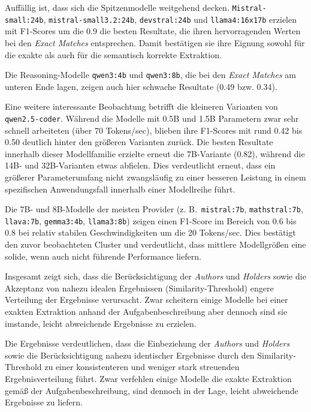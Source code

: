 Auffällig ist, dass sich die Spitzenmodelle weitgehend decken. \texttt{Mistral-small:24b}, \texttt{mistral-small3.2:24b}, \texttt{devstral:24b} und \texttt{llama4:16x17b} erzielen mit F1-Scores um die \num{0.9} die besten Resultate, die ihren hervorragenden Werten bei den \textit{Exact Matches} entsprechen.
Damit bestätigen sie ihre Eignung sowohl für die exakte als auch für die semantisch korrekte Extraktion.

Die Reasoning-Modelle \texttt{qwen3:4b} und \texttt{qwen3:8b}, die bei den \textit{Exact Matches} am unteren Ende lagen, zeigen auch hier schwache Resultate (\num{0.49} bzw. \num{0.34}).

Eine weitere interessante Beobachtung betrifft die kleineren Varianten von \texttt{qwen2.5-coder}.
Während die Modelle mit 0.5B und 1.5B Parametern zwar sehr schnell arbeiteten (über 70 Tokens/sec), blieben ihre F1-Scores mit rund \num{0.42} bis \num{0.50} deutlich hinter den größeren Varianten zurück.
Die besten Resultate innerhalb dieser Modellfamilie erzielte erneut die 7B-Variante (\num{0.82}), während die 14B- und 32B-Varianten etwas abfielen.
Dies verdeutlicht erneut, dass ein größerer Parameterumfang nicht zwangsläufig zu einer besseren Leistung in einem spezifischen Anwendungsfall innerhalb einer Modellreihe führt.

Die 7B- und 8B-Modelle der meisten Provider (z. B.\ \texttt{mistral:7b}, \texttt{mathstral:7b}, \texttt{llava:7b}, \texttt{gemma3:4b}, \texttt{llama3:8b}) zeigen einen F1-Score im Bereich von \num{0.6} bis \num{0.8} bei relativ stabilen Geschwindigkeiten um die 20 Tokens/sec.
Dies bestätigt den zuvor beobachteten Cluster und verdeutlicht, dass mittlere Modellgrößen eine solide, wenn auch nicht führende Performance liefern.

Insgesamt zeigt sich, dass die Berücksichtigung der \textit{Authors} und \textit{Holders} sowie die Akzeptanz von nahezu idealen Ergebnissen (Similarity-Threshold) engere Verteilung der Ergebnisse verursacht.
Zwar scheitern einige Modelle bei einer exakten Extraktion anhand der Aufgabenbeschreibung aber dennoch sind sie imstande, leicht abweichende Ergebnisse zu erzielen.

Die Ergebnisse verdeutlichen, dass die Einbeziehung der \textit{Authors} und \textit{Holders} sowie die Berücksichtigung nahezu identischer Ergebnisse durch den Similarity-Threshold zu einer konsistenteren und weniger stark streuenden Ergebnisverteilung führt.
Zwar verfehlen einige Modelle die exakte Extraktion gemäß der Aufgabenbeschreibung, sind dennoch in der Lage, leicht abweichende Ergebnisse zu liefern.


